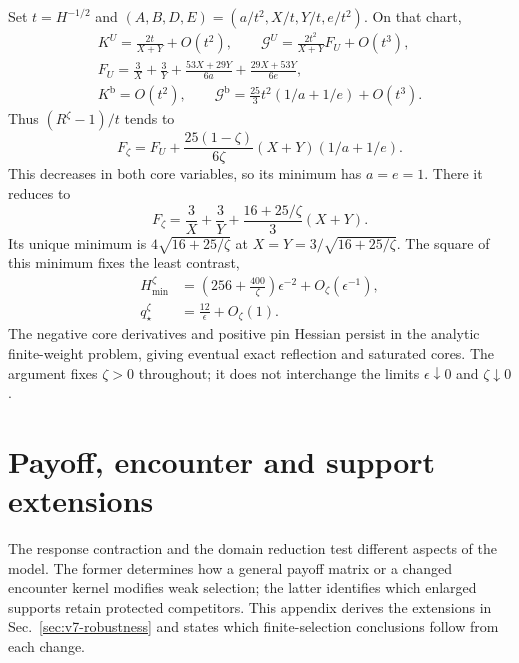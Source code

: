 \documentclass[aps,pre,reprint,amsmath,amssymb,longbibliography]{revtex4-2}
\begin{document}
Set $t=H^{-1/2}$ and
$(A,B,D,E)=(a/t^2,X/t,Y/t,e/t^2)$. On that chart,
\begin{equation}
 \begin{gathered}
 K^U=\frac{2t}{X+Y}+O(t^2),\qquad
 \mathcal G^U=\frac{2t^2}{X+Y}F_U+O(t^3),\\
 F_U=\frac3X+\frac3Y+
       \frac{53X+29Y}{6a}+
       \frac{29X+53Y}{6e},\\
 K^{\mathrm b}=O(t^2),\qquad
 \mathcal G^{\mathrm b}=\frac{25}{3}t^2(1/a+1/e)+O(t^3).
 \end{gathered}
 \label{eq:v7-mixture-leading-data}
\end{equation}
Thus $(R^\zeta-1)/t$ tends to
\begin{equation}
 F_\zeta=F_U+
 \frac{25(1-\zeta)}{6\zeta}(X+Y)(1/a+1/e).
 \label{eq:v7-mixture-objective}
\end{equation}
This decreases in both core variables, so its minimum has $a=e=1$.
There it reduces to
\begin{equation}
 F_\zeta=\frac3X+\frac3Y+
       \frac{16+25/\zeta}{3}(X+Y).
 \label{eq:v7-mixture-reduced-objective}
\end{equation}
Its unique minimum is $4\sqrt{16+25/\zeta}$ at
$X=Y=3/\sqrt{16+25/\zeta}$. The square of this minimum fixes the least contrast,
\begin{equation}
 \begin{aligned}
 H_{\min}^{\zeta}&=\left(256+\frac{400}{\zeta}\right)\epsilon^{-2}
       +O_\zeta(\epsilon^{-1}),\\
 q_\star^\zeta&=\frac{12}{\epsilon}+O_\zeta(1).
 \end{aligned}
 \label{eq:v7-mixture-cost-main}
\end{equation}
The negative core derivatives and positive pin Hessian persist in
the analytic finite-weight problem, giving eventual exact reflection
and saturated cores. The argument fixes $\zeta>0$ throughout;
it does not interchange the limits $\epsilon\downarrow0$ and
$\zeta\downarrow0$.


\section{Payoff, encounter and support extensions}
\label{app:v7-robustness}

The response contraction and the domain reduction test different aspects
of the model. The former determines how a general payoff matrix or a
changed encounter kernel modifies weak selection; the latter identifies
which enlarged supports retain protected competitors. This appendix
derives the extensions in Sec.~\ref{sec:v7-robustness} and states which
finite-selection conclusions follow from each change.
\end{document}
